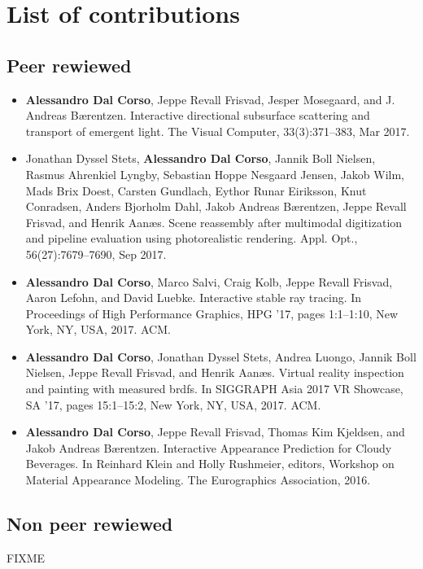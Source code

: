 \chapter*{List of contributions}
\label{sec:contributionlist}
\section*{Peer rewiewed}
\begin{itemize}
\item \textbf{Alessandro Dal Corso}, Jeppe Revall Frisvad, Jesper Mosegaard, and J. Andreas Bærentzen. Interactive directional subsurface scattering and transport of emergent light. The Visual Computer, 33(3):371–383, Mar 2017.~\cite{dalcorso17dirsss}
\item Jonathan Dyssel Stets, \textbf{Alessandro Dal Corso}, Jannik Boll Nielsen, Rasmus Ahrenkiel Lyngby, Sebastian Hoppe Nesgaard Jensen, Jakob Wilm, Mads Brix Doest, Carsten Gundlach, Eythor Runar Eiriksson, Knut Conradsen, Anders Bjorholm Dahl, Jakob Andreas Bærentzen, Jeppe Revall Frisvad, and Henrik Aanæs. Scene reassembly after multimodal digitization and pipeline evaluation using photorealistic rendering. Appl. Opt., 56(27):7679–7690, Sep 2017.~\cite{stets17}
\item \textbf{Alessandro Dal Corso}, Marco Salvi, Craig Kolb, Jeppe Revall Frisvad, Aaron Lefohn, and David Luebke. Interactive stable ray tracing. In Proceedings of High Performance Graphics, HPG ’17, pages 1:1–1:10, New York, NY, USA, 2017. ACM. \cite{dalcorso17hpg}
\item \textbf{Alessandro Dal Corso}, Jonathan Dyssel Stets, Andrea Luongo, Jannik Boll Nielsen, Jeppe Revall Frisvad, and Henrik Aanæs. Virtual reality inspection and painting with measured brdfs. In SIGGRAPH Asia 2017 VR Showcase, SA ’17, pages 15:1–15:2, New York, NY, USA, 2017. ACM.~\cite{dalcorso17vr}
\item \textbf{Alessandro Dal Corso}, Jeppe Revall Frisvad, Thomas Kim Kjeldsen, and Jakob Andreas Bærentzen. Interactive Appearance Prediction for Cloudy Beverages. In Reinhard Klein and Holly Rushmeier, editors, Workshop on Material Appearance Modeling. The Eurographics Association, 2016.~\cite{dalcorsomam16}
\end{itemize}

\section*{Non peer rewiewed}
 FIXME

